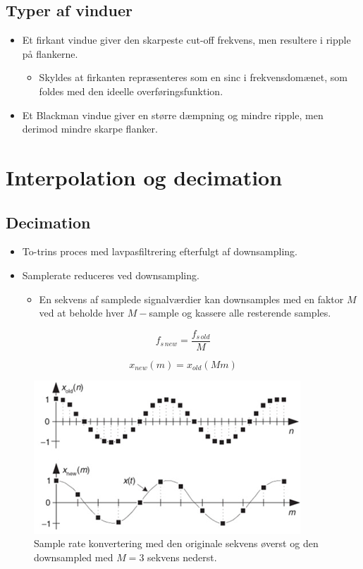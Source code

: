 \documentclass[danish]{article}
\begin{document}
\subsection{Typer af vinduer}
\begin{itemize}
	\item Et firkant vindue giver den skarpeste cut-off frekvens, men resultere i ripple på flankerne.
	\begin{itemize}
		\item Skyldes at firkanten repræsenteres som en sinc i frekvensdomænet, som foldes med den ideelle overføringsfunktion.
	\end{itemize}
	\item Et Blackman vindue giver en større dæmpning og mindre ripple, men derimod mindre skarpe flanker.
\end{itemize}

\newpage
\section{Interpolation og decimation}
\subsection{Decimation}
\begin{itemize}
	\item To-trins proces med lavpasfiltrering efterfulgt af downsampling.
	\item Samplerate reduceres ved downsampling.
	\begin{itemize}
		\item En sekvens af samplede signalværdier kan downsamples med en faktor $M$ ved at beholde hver $M-$sample og kassere alle resterende samples.
	\end{itemize}
\end{itemize}

\begin{equation}
f_{s\, new} = \frac{f_{s\, old}}{M}
\end{equation}

\begin{equation}
x_{new}(m) = x_{old}(Mm)
\end{equation}

\begin{figure}[H]
	\centering
	\includegraphics[width=0.6\linewidth]{graphics/decimation}
	\caption{Sample rate konvertering med den originale sekvens øverst og den downsampled med $M = 3$ sekvens nederst.}
	\label{fig:decimation}
\end{figure}
\end{document}
